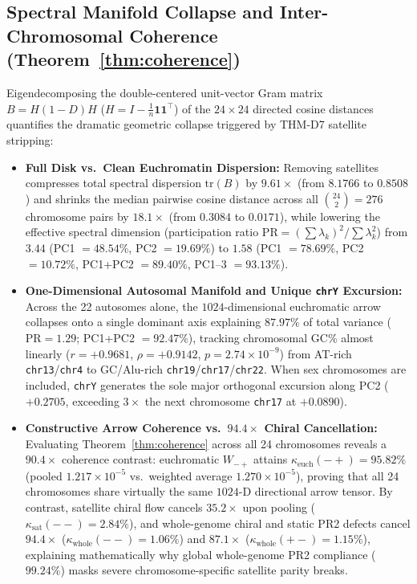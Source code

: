 \documentclass[11pt,a4paper]{article}
\newcommand{\Wmp}{W_{-+}}
\begin{document}
\subsection{Spectral Manifold Collapse and Inter-Chromosomal Coherence (Theorem~\ref{thm:coherence})}
\label{sec:manifold}
Eigendecomposing the double-centered unit-vector Gram matrix $B = H(1-D)H$ ($H = I - \frac{1}{n}\mathbf{1}\mathbf{1}^\top$) of the $24\times 24$ directed cosine distances quantifies the dramatic geometric collapse triggered by THM-D7 satellite stripping:
\begin{itemize}
  \item \textbf{Full Disk vs.\ Clean Euchromatin Dispersion:} Removing satellites compresses total spectral dispersion $\mathrm{tr}(B)$ by $9.61\times$ (from $8.1766$ to $0.8508$) and shrinks the median pairwise cosine distance across all $\binom{24}{2}=276$ chromosome pairs by $18.1\times$ (from $0.3084$ to $0.0171$), while lowering the effective spectral dimension (participation ratio $\mathrm{PR}=(\sum\lambda_k)^2/\sum\lambda_k^2$) from $3.44$ (PC1 $=48.54\%$, PC2 $=19.69\%$) to $1.58$ (PC1 $=78.69\%$, PC2 $=10.72\%$, PC1+PC2 $=89.40\%$, PC1--3 $=93.13\%$).
  \item \textbf{One-Dimensional Autosomal Manifold and Unique \texttt{chrY} Excursion:} Across the 22 autosomes alone, the $1024$-dimensional euchromatic arrow collapses onto a single dominant axis explaining $\mathbf{87.97\%}$ of total variance ($\mathrm{PR}=\mathbf{1.29}$; PC1+PC2 $=92.47\%$), tracking chromosomal GC\% almost linearly ($r=+0.9681$, $\rho=+0.9142$, $p=2.74\times 10^{-9}$) from AT-rich \texttt{chr13}/\texttt{chr4} to GC/Alu-rich \texttt{chr19}/\texttt{chr17}/\texttt{chr22}. When sex chromosomes are included, \texttt{chrY} generates the sole major orthogonal excursion along PC2 ($+0.2705$, exceeding $3\times$ the next chromosome \texttt{chr17} at $+0.0890$).
  \item \textbf{Constructive Arrow Coherence vs.\ $94.4\times$ Chiral Cancellation:} Evaluating Theorem~\ref{thm:coherence} across all 24 chromosomes reveals a $90.4\times$ coherence contrast: euchromatic $\Wmp$ attains $\kappa_{\mathrm{euch}}(-+)=\mathbf{95.82\%}$ (pooled $1.217\times 10^{-5}$ vs.\ weighted average $1.270\times 10^{-5}$), proving that all 24 chromosomes share virtually the same $1024$-D directional arrow tensor. By contrast, satellite chiral flow cancels $35.2\times$ upon pooling ($\kappa_{\mathrm{sat}}(--)=2.84\%$), and whole-genome chiral and static PR2 defects cancel $94.4\times$ ($\kappa_{\mathrm{whole}}(--)=1.06\%$) and $87.1\times$ ($\kappa_{\mathrm{whole}}(+-)=1.15\%$), explaining mathematically why global whole-genome PR2 compliance ($99.24\%$) masks severe chromosome-specific satellite parity breaks.
\end{itemize}
\end{document}
